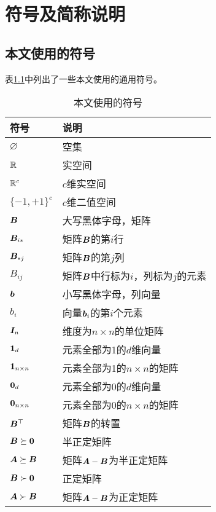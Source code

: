 \chapter{符号及简称说明}\label{chp:appendix}
\section{本文使用的符号}
表\ref{tab:appendix-notaions}中列出了一些本文使用的通用符号。
\begin{table}[H]
\centering
\caption{本文使用的符号}
\label{tab:appendix-notaions}
\begin{tabular}{ll}
\toprule
符号                    &    说明                                    \\\midrule
$\varnothing$          &    空集                                    \\
${\mathbb R}$                  &    实空间                                   \\
${\mathbb R}^c$                &    $c$维实空间                              \\ 
$\{-1,+1\}^c$          &    $c$维二值空间                            \\
${\boldsymbol B}$                   &    大写黑体字母，矩阵                        \\
${\boldsymbol B}_{i*}$              &    矩阵${\boldsymbol B}$的第$i$行                        \\
${\boldsymbol B}_{*j}$              &    矩阵${\boldsymbol B}$的第$j$列                        \\
$B_{ij}$               &    矩阵${\boldsymbol B}$中行标为$i$，列标为$j$的元素        \\
${\boldsymbol b}$                   &    小写黑体字母，列向量                       \\
$b_i$                  &    向量${\boldsymbol b}_i$的第$i$个元素                   \\
${\boldsymbol I}_n$                 &    维度为$n\times n$的单位矩阵               \\
${\bf 1}_d$              &    元素全部为1的$d$维向量                    \\
${\bf 1}_{n\times n}$    &    元素全部为1的$n\times n$的矩阵            \\
${\bf 0}_d$             &    元素全部为0的$d$维向量                    \\
${\bf 0}_{n\times n}$   &    元素全部为0的$n\times n$的矩阵            \\
${\boldsymbol B}^\top$              &    矩阵${\boldsymbol B}$的转置                           \\
${\boldsymbol B}\succeq{\bf 0}$      &    半正定矩阵                               \\
${\boldsymbol A}\succeq{\boldsymbol B}$          &    矩阵${\boldsymbol A}-{\boldsymbol B}$为半正定矩阵                   \\
${\boldsymbol B}\succ{\bf 0}$        &    正定矩阵                                \\
${\boldsymbol A}\succ{\boldsymbol B}$            &    矩阵${\boldsymbol A}-{\boldsymbol B}$为正定矩阵                    \\
\bottomrule
\end{tabular}
\end{table}

